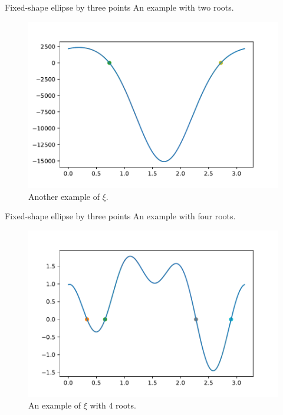 \documentclass{beamer}
\begin{document}
\begin{frame}{Fixed-shape ellipse by three points}
	An example with two roots.
\begin{figure}
	\centering
	
	\includegraphics[scale=.5]{012}
	\caption{Another example of $\xi$.}
\end{figure}
\end{frame}

\begin{frame}{Fixed-shape ellipse by three points}
	An example with four roots.
	\begin{figure}
		\centering
		
		\includegraphics[scale=.5]{g4sol}
		\caption{An example of $\xi$ with $4$ roots.}
	\end{figure}
\end{frame}
\end{document}
